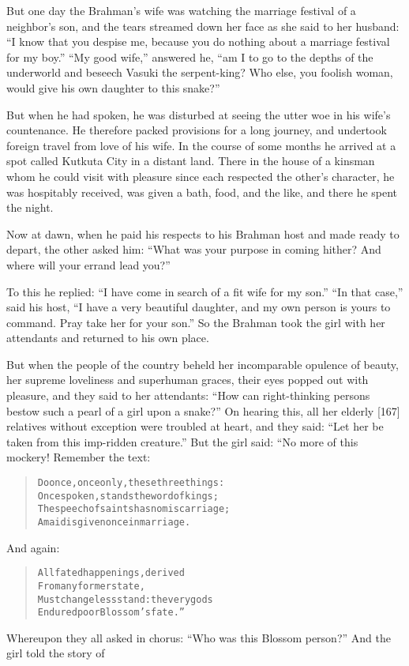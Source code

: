 \documentclass[article, twoside, 14pt]{memoir}
\renewenvironment{verbatim}{%
\begin{quote}%
\vskip -10pt%
\begin{alltt}\normalfont\large}{\end{alltt}%
\end{quote}%
\vskip -10pt
} %
\begin{document}
But one day the Brahman's wife was watching the marriage festival
of a neighbor's son, and the tears streamed down her face as she
said to her husband:
``I know that you despise me, because you do nothing about a marriage festival for my boy.''
``My good wife,'' answered he,
``am I to go to the depths of the underworld and beseech Vasuki the serpent-king? Who else, you foolish woman, would give his own daughter to this snake?''

But when he had spoken, he was disturbed at seeing the utter woe in
his wife's countenance. He therefore packed provisions for a long
journey, and undertook foreign travel from love of his wife. In the
course of some months he arrived at a spot called Kutkuta City in a
distant land. There in the house of a kinsman whom he could visit
with pleasure since each respected the other's character, he was
hospitably received, was given a bath, food, and the like, and
there he spent the night.

Now at dawn, when he paid his respects to his Brahman host and made
ready to depart, the other asked him:
``What was your purpose in coming hither? And where will your errand lead you?''

To this he replied:
``I have come in search of a fit wife for my son.''
``In that case,'' said his host,
``I have a very beautiful daughter, and my own person is yours to command. Pray take her for your son.''
So the Brahman took the girl with her attendants and returned to
his own place.

But when the people of the country beheld her incomparable opulence
of beauty, her supreme loveliness and superhuman graces, their eyes
popped out with pleasure, and they said to her attendants:
``How can right-thinking persons bestow such a pearl of a girl upon a snake?''
On hearing this, all her elderly [167] relatives without exception
were troubled at heart, and they said:
``Let her be taken from this imp-ridden creature.'' But the girl
said: “No more of this mockery! Remember the text:

\begin{verbatim}
Do once, once only, these three things:
Once spoken, stands the word of kings;
The speech of saints has no miscarriage;
A maid is given once in marriage.
\end{verbatim}
And again:

\begin{verbatim}
All fated happenings, derived
    From any former state,
Must changeless stand: the very gods
    Endured poor Blossom's fate.”
\end{verbatim}
Whereupon they all asked in chorus:
``Who was this Blossom person?'' And the girl told the story of
\label{s27}
\end{document}
